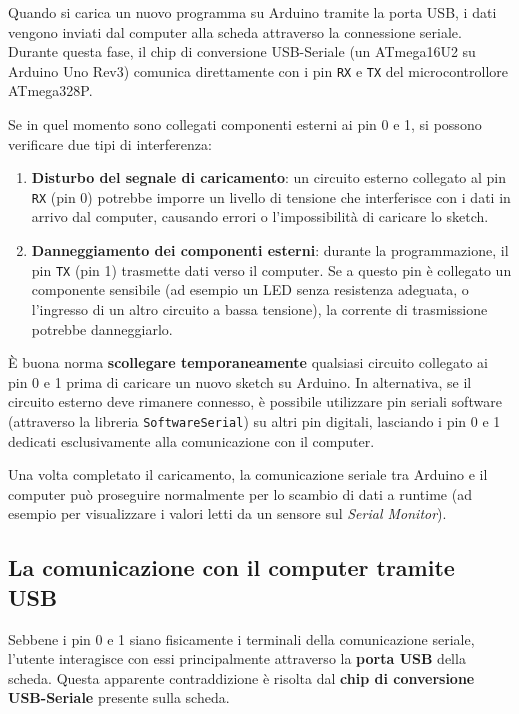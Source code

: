 Quando si carica un nuovo programma su Arduino tramite la porta USB, i dati vengono inviati dal computer alla scheda attraverso la connessione seriale. Durante questa fase, il chip di conversione USB-Seriale (un ATmega16U2 su Arduino Uno Rev3) comunica direttamente con i pin \texttt{RX} e \texttt{TX} del microcontrollore ATmega328P.

Se in quel momento sono collegati componenti esterni ai pin 0 e 1, si possono verificare due tipi di interferenza:

\begin{enumerate}
    \item \textbf{Disturbo del segnale di caricamento}: un circuito esterno collegato al pin \texttt{RX} (pin 0) potrebbe imporre un livello di tensione che interferisce con i dati in arrivo dal computer, causando errori o l'impossibilità di caricare lo sketch.
    \item \textbf{Danneggiamento dei componenti esterni}: durante la programmazione, il pin \texttt{TX} (pin 1) trasmette dati verso il computer. Se a questo pin è collegato un componente sensibile (ad esempio un LED senza resistenza adeguata, o l'ingresso di un altro circuito a bassa tensione), la corrente di trasmissione potrebbe danneggiarlo.
\end{enumerate}

\begin{tcolorbox}[colback=red!4, colframe=red!60, title=\textbf{Attenzione – Scollegare i circuiti esterni prima del caricamento}]
    È buona norma \textbf{scollegare temporaneamente} qualsiasi circuito collegato ai pin 0 e 1 prima di caricare un nuovo sketch su Arduino. In alternativa, se il circuito esterno deve rimanere connesso, è possibile utilizzare pin seriali software (attraverso la libreria \texttt{SoftwareSerial}) su altri pin digitali, lasciando i pin 0 e 1 dedicati esclusivamente alla comunicazione con il computer.
\end{tcolorbox}

Una volta completato il caricamento, la comunicazione seriale tra Arduino e il computer può proseguire normalmente per lo scambio di dati a runtime (ad esempio per visualizzare i valori letti da un sensore sul \textit{Serial Monitor}).

\subsection*{La comunicazione con il computer tramite USB}

Sebbene i pin 0 e 1 siano fisicamente i terminali della comunicazione seriale, l'utente interagisce con essi principalmente attraverso la \textbf{porta USB} della scheda. Questa apparente contraddizione è risolta dal \textbf{chip di conversione USB-Seriale} presente sulla scheda.

